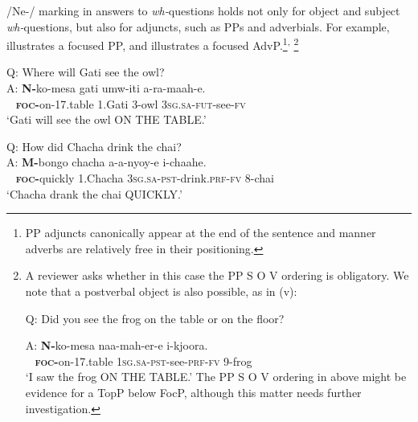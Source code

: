 \documentclass[output=paper,modfonts]{langscibook}
\begin{document}
\newpage 
/Ne-/ marking in answers to \textit{wh-}questions holds not only for object and subject \textit{wh-}questions, but also for adjuncts, such as PPs and adverbials. For example,  illustrates a focused PP, and  illustrates a focused AdvP.\footnote{%
  PP adjuncts canonically appear at the end of the sentence and manner adverbs are relatively free in their positioning.}\textsuperscript{,}%
\footnote{%
A reviewer asks whether in this case the PP S O V ordering is obligatory. We note that a postverbal object is also possible, as in (v):

    \ea

    Q: Did you see the frog on the table or on the floor?

    \gll A: \textbf{N-}ko-mesa naa-mah-er-e i-kjoora.\\
    ~ \textsc{\textbf{foc}}\textbf{-}on-17.table \textsc{1sg}.\textsc{sa}-\textsc{pst}-see-\textsc{prf}-\textsc{fv} 9-frog\\
    \glt ‘I saw the frog ON THE TABLE.’
    \z
    The PP S O V ordering in  above might be evidence for a TopP below FocP, although this matter needs further investigation.
}

\ea\label{ex:landmann:11}
Q: Where will Gati see the owl?\\
\gll A: \textbf{N-}ko-mesa gati umw-iti a-ra-maah-e.\\
   ~  \textsc{\textbf{foc}}\textbf{-}on-17.table 1.Gati 3-owl \textsc{3sg}.\textsc{sa}-\textsc{fut}-see-\textsc{fv}\\
\glt ‘Gati will see the owl ON THE TABLE.’
\z

\ea\label{ex:landmann:12}
Q: How did Chacha drink the chai?\\
\gll A: \textbf{M-}bongo chacha a-a-nyoy-e i-chaahe.\\
     ~ \textsc{\textbf{foc}}\textbf{-}quickly 1.Chacha \textsc{3sg}.\textsc{sa}-\textsc{pst}-drink.\textsc{prf}-\textsc{fv} 8-chai\\
\glt ‘Chacha drank the chai QUICKLY.’
\z
\end{document}

